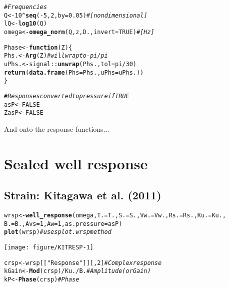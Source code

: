 \documentclass[12pt]{article}\usepackage[]{graphicx}\usepackage[]{xcolor}
\makeatletter
\def\maxwidth{ %
  \ifdim\Gin@nat@width>\linewidth
    \linewidth
  \else
    \Gin@nat@width
  \fi
}
\newcommand{\hlnum}[1]{\textcolor[rgb]{0.686,0.059,0.569}{#1}}%
\newcommand{\hlsng}[1]{\textcolor[rgb]{0.192,0.494,0.8}{#1}}%
\newcommand{\hlcom}[1]{\textcolor[rgb]{0.678,0.584,0.686}{\textit{#1}}}%
\newcommand{\hlopt}[1]{\textcolor[rgb]{0,0,0}{#1}}%
\newcommand{\hldef}[1]{\textcolor[rgb]{0.345,0.345,0.345}{#1}}%
\newcommand{\hlkwa}[1]{\textcolor[rgb]{0.161,0.373,0.58}{\textbf{#1}}}%
\newcommand{\hlkwb}[1]{\textcolor[rgb]{0.69,0.353,0.396}{#1}}%
\newcommand{\hlkwc}[1]{\textcolor[rgb]{0.333,0.667,0.333}{#1}}%
\newcommand{\hlkwd}[1]{\textcolor[rgb]{0.737,0.353,0.396}{\textbf{#1}}}%
\newenvironment{kframe}{%
 \def\at@end@of@kframe{}%
 \ifinner\ifhmode%
  \def\at@end@of@kframe{\end{minipage}}%
  \begin{minipage}{\columnwidth}%
 \fi\fi%
 \def\FrameCommand##1{\hskip\@totalleftmargin \hskip-\fboxsep
 \colorbox{shadecolor}{##1}\hskip-\fboxsep
     \hskip-\linewidth \hskip-\@totalleftmargin \hskip\columnwidth}%
 \MakeFramed {\advance\hsize-\width
   \@totalleftmargin\z@ \linewidth\hsize
   \@setminipage}}%
 {\par\unskip\endMakeFramed%
 \at@end@of@kframe}
\newenvironment{knitrout}{}{} %
\makeatother
\begin{document}
\begin{knitrout}\small
{}\color{fgcolor}\begin{kframe}
\begin{alltt}
\hlcom{# Frequencies}
\hldef{Q} \hlkwb{<-} \hlnum{10}\hlopt{^}\hlkwd{seq}\hldef{(}\hlopt{-}\hlnum{5}\hldef{,} \hlnum{2}\hldef{,} \hlkwc{by} \hldef{=} \hlnum{0.05}\hldef{)}  \hlcom{# [nondimensional]}
\hldef{lQ} \hlkwb{<-} \hlkwd{log10}\hldef{(Q)}
\hldef{omega} \hlkwb{<-} \hlkwd{omega_norm}\hldef{(Q, z, D.,} \hlkwc{invert} \hldef{=} \hlnum{TRUE}\hldef{)}  \hlcom{# [Hz]}

\hldef{Phase} \hlkwb{<-} \hlkwa{function}\hldef{(}\hlkwc{Z}\hldef{) \{}
    \hldef{Phs.} \hlkwb{<-} \hlkwd{Arg}\hldef{(Z)}  \hlcom{# will wrap to -pi/pi}
    \hldef{uPhs.} \hlkwb{<-} \hldef{signal}\hlopt{::}\hlkwd{unwrap}\hldef{(Phs.,} \hlkwc{tol} \hldef{= pi}\hlopt{/}\hlnum{30}\hldef{)}
    \hlkwd{return}\hldef{(}\hlkwd{data.frame}\hldef{(}\hlkwc{Phs} \hldef{= Phs.,} \hlkwc{uPhs} \hldef{= uPhs.))}
\hldef{\}}

\hlcom{# Responses converted to pressure if TRUE}
\hldef{asP} \hlkwb{<-} \hlnum{FALSE}
\hldef{ZasP} \hlkwb{<-} \hlnum{FALSE}
\end{alltt}
\end{kframe}
\end{knitrout}

And onto the response functions...

\clearpage
\section{Sealed well response}

\subsection{Strain: Kitagawa et al. (2011)}
%
\begin{knitrout}\small
{}\color{fgcolor}\begin{kframe}
\begin{alltt}
\hldef{wrsp} \hlkwb{<-} \hlkwd{well_response}\hldef{(omega,} \hlkwc{T.} \hldef{= T.,} \hlkwc{S.} \hldef{= S.,} \hlkwc{Vw.} \hldef{= Vw.,} \hlkwc{Rs.} \hldef{= Rs.,} \hlkwc{Ku.} \hldef{= Ku.,}
    \hlkwc{B.} \hldef{= B.,} \hlkwc{Avs} \hldef{=} \hlnum{1}\hldef{,} \hlkwc{Aw} \hldef{=} \hlnum{1}\hldef{,} \hlkwc{as.pressure} \hldef{= asP)}
\hlkwd{plot}\hldef{(wrsp)}  \hlcom{# uses plot.wrsp method}
\end{alltt}
\end{kframe}
\texttt{[image: figure/KITRESP-1]} 
\begin{kframe}\begin{alltt}
\hldef{crsp} \hlkwb{<-} \hldef{wrsp[[}\hlsng{"Response"}\hldef{]][,} \hlnum{2}\hldef{]}  \hlcom{# Complex response}
\hldef{kGain} \hlkwb{<-} \hlkwd{Mod}\hldef{(crsp)}\hlopt{/}\hldef{Ku.}\hlopt{/}\hldef{B.}  \hlcom{# Amplitude (or Gain)}
\hldef{kP} \hlkwb{<-} \hlkwd{Phase}\hldef{(crsp)}  \hlcom{# Phase}
\end{alltt}
\end{kframe}
\end{knitrout}
\end{document}
